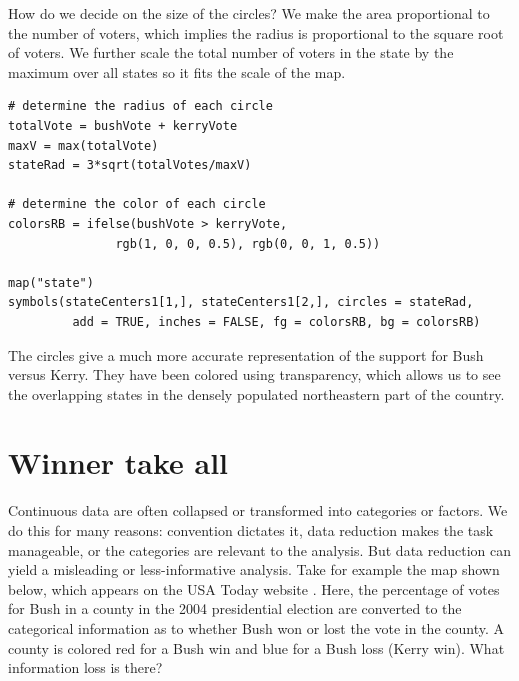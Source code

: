 How do we decide on the size of the circles? 
We make the area proportional to the number of voters, 
which implies the radius is proportional to the square root of voters.
We further scale the total number of voters in the state by the 
maximum over all states so it fits the scale of the map.
\begin{verbatim}
# determine the radius of each circle
totalVote = bushVote + kerryVote
maxV = max(totalVote)
stateRad = 3*sqrt(totalVotes/maxV)

# determine the color of each circle
colorsRB = ifelse(bushVote > kerryVote, 
               rgb(1, 0, 0, 0.5), rgb(0, 0, 1, 0.5))

map("state")
symbols(stateCenters1[1,], stateCenters1[2,], circles = stateRad,
         add = TRUE, inches = FALSE, fg = colorsRB, bg = colorsRB)
\end{verbatim}

The circles give a much more accurate representation of the support
for Bush versus Kerry. They have been colored using transparency, which
allows us to see the overlapping states in the densely populated
northeastern part of the country.


\section{Winner take all}
Continuous data are often collapsed or transformed into categories or factors. We do this for many reasons: convention dictates it, data reduction makes the task manageable, or the categories are relevant to the analysis. But data reduction can yield a misleading or less-informative analysis. Take for example the map shown below, which appears on the USA Today website . Here, the percentage of votes for Bush in a county in the 2004 presidential election are converted to the categorical information as to whether Bush won or lost the vote in the county. A county is colored red for a Bush win and blue for a Bush loss (Kerry win). What information loss is there?

